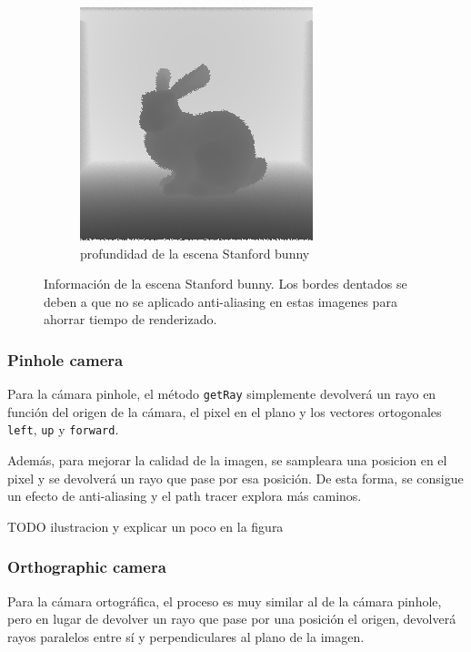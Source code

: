 \documentclass{article}
\begin{document}
\begin{figure}[H]
\begin{subfigure}[h]{0.4\linewidth}
    \includegraphics[width=\linewidth]{imgs/depth.png}
    \caption{profundidad de la escena Stanford bunny}
  \end{subfigure}
  \caption{Información de la escena Stanford bunny. Los bordes dentados se deben
    a que no se aplicado anti-aliasing en estas imagenes para ahorrar tiempo de
    renderizado.}
\end{figure}

\subsubsection{Pinhole camera}
Para la cámara pinhole, el método \texttt{getRay} simplemente devolverá un rayo
en función del origen de la cámara, el pixel en el plano y los vectores
ortogonales \texttt{left}, \texttt{up} y \texttt{forward}.

Además, para mejorar la calidad de la imagen, se sampleara una posicion en el
pixel y se devolverá un rayo que pase por esa posición. De esta forma, se
consigue un efecto de anti-aliasing y el path tracer explora más caminos.

TODO ilustracion y explicar un poco en la figura

\subsubsection{Orthographic camera}
Para la cámara ortográfica, el proceso es muy similar al de la cámara pinhole,
pero en lugar de devolver un rayo que pase por una posición el origen, devolverá
rayos paralelos entre sí y perpendiculares al plano de la imagen.
\end{document}
